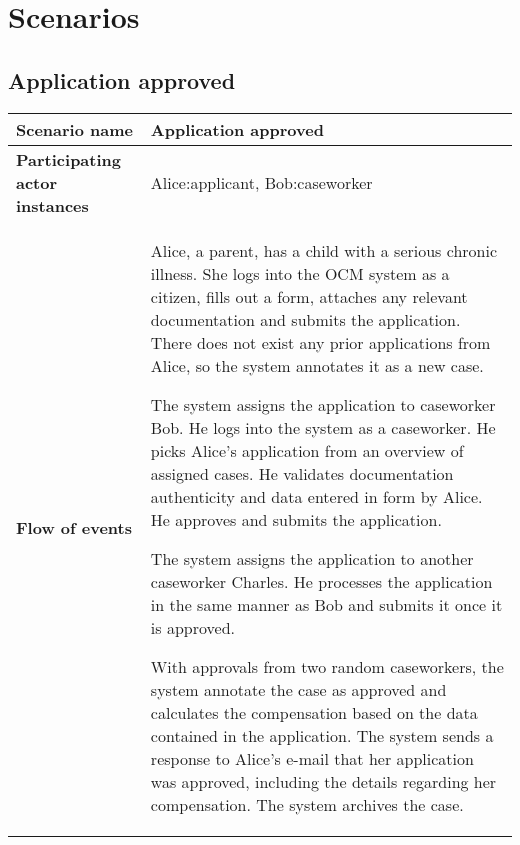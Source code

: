 \newpage
\section{Scenarios}
\subsection*{Application approved}
\begin{table}[htb!]
\begin{tabularx}{\textwidth}{l|X}
	\textbf{Scenario name} & Application approved \\
	\hline
	\textbf{Participating actor instances} & Alice:applicant, Bob:caseworker\\
	\hline
	\textbf{Flow of events} &
	\begin{compactenum}
			\item Alice, a parent, has a child with a serious chronic illness. She logs into the OCM system as a citizen, fills out a form, attaches any relevant documentation and submits the application. There does not exist any prior applications from Alice, so the system annotates it as a new case.
			\item The system assigns the application to caseworker Bob. He logs into the system as a caseworker. He picks Alice's application from an overview of assigned cases. He validates documentation authenticity and data entered in form by Alice. He approves and submits the application.
			\item The system assigns the application to another caseworker Charles. He processes the application in the same manner as Bob and submits it once it is approved.
			\item With approvals from two random caseworkers, the system annotate the case as approved and calculates the compensation based on the data contained in the application. The system sends a response to Alice's e-mail that her application was approved, including the details regarding her compensation. The system archives the case.
    \end{compactenum}\\
	\hline
\end{tabularx}
\end{table}


